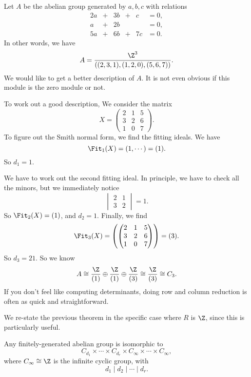 \documentclass[a4paper]{article}
\begin{document}
\begin{eg}
  Let $A$ be the abelian group generated by $a, b, c$ with relations
  \[
    \begin{alignedat}{4}
      2a & {}+{} & 3b & {}+{} & c &= 0,\\
      a & {}+{} & 2b & & &= 0,\\
      5a & {}+{} & 6b & {}+{} & 7c &= 0.
    \end{alignedat}
  \]
  In other words, we have
  \[
    A = \frac{\Z^3}{((2, 3, 1), (1, 2, 0), (5, 6, 7))}.
  \]
  We would like to get a better description of $A$. It is not even obvious if this module is the zero module or not.

  To work out a good description, We consider the matrix
  \[
    X =
    \begin{pmatrix}
      2 & 1 & 5\\
      3 & 2 & 6\\
      1 & 0 & 7
    \end{pmatrix}.
  \]
  To figure out the Smith normal form, we find the fitting ideals. We have
  \[
    \Fit_1(X) = (1, \cdots) = (1).
  \]
  So $d_1 = 1$.

  We have to work out the second fitting ideal. In principle, we have to check all the minors, but we immediately notice
  \[
    \begin{vmatrix}
      2 & 1\\
      3 & 2
    \end{vmatrix} = 1.
  \]
  So $\Fit_2(X) = (1)$, and $d_2 = 1$. Finally, we find
  \[
    \Fit_3(X) =
    \left(\begin{pmatrix}
      2 & 1 & 5\\
      3 & 2 & 6\\
      1 & 0 & 7
    \end{pmatrix}\right) = (3).
  \]
  So $d_3 = 21$. So we know
  \[
    A \cong \frac{\Z}{(1)} \oplus \frac{\Z}{(1)} \oplus \frac{\Z}{(3)} \cong \frac{\Z}{(3)} \cong C_3.
  \]
  If you don't feel like computing determinants, doing row and column reduction is often as quick and straightforward.
\end{eg}

We re-state the previous theorem in the specific case where $R$ is $\Z$, since this is particularly useful.
\begin{cor}
  Any finitely-generated abelian group is isomorphic to
  \[
    C_{d_1} \times \cdots \times C_{d_r} \times C_\infty \times \cdots \times C_\infty,
  \]
  where $C_\infty \cong \Z$ is the infinite cyclic group, with
  \[
    d_1 \mid d_2 \mid \cdots \mid d_r.
  \]
\end{cor}
\end{document}
